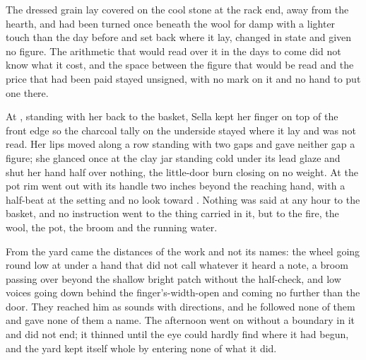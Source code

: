 The dressed grain lay covered on the cool stone at the rack end, away from the hearth, and had been turned once beneath the wool for damp with a lighter touch than the day before and set back where it lay, changed in state and given no figure. The arithmetic that would read over it in the days to come did not know what it cost, and the space between the figure that would be read and the price that had been paid stayed unsigned, with no mark on it and no hand to put one there.

\scenebreak

At , standing with her back to the basket, Sella kept her finger on top of the front edge so the charcoal tally on the underside stayed where it lay and was not read. Her lips moved along a row standing with two gaps and gave neither gap a figure; she glanced once at the clay jar standing cold under its lead glaze and shut her hand half over nothing, the little-door burn closing on no weight. At  the pot rim went out with its handle two inches beyond the reaching hand, with a half-beat at the setting and no look toward . Nothing was said at any hour to the basket, and no instruction went to the thing carried in it, but to the fire, the wool, the pot, the broom and the running water.

From the yard came the distances of the work and not its names: the wheel going round low at  under a hand that did not call whatever it heard a note, a broom passing over  beyond the shallow bright patch without the half-check, and low voices going down behind the finger's-width-open  and coming no further than the door. They reached him as sounds with directions, and he followed none of them and gave none of them a name. The afternoon went on without a boundary in it and did not end; it thinned until the eye could hardly find where it had begun, and the yard kept itself whole by entering none of what it did.

